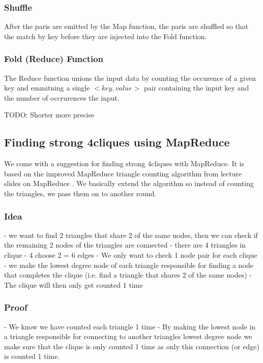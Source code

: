 \documentclass{article}
\begin{document}
\subsubsection{Shuffle}
After the paris are emitted by the Map function, the paris are shuffled so that the match by key before they are injected into the Fold function.

\subsubsection{Fold (Reduce) Function}
The Reduce function unions the input data by counting the occurence of a given key and emmitning a single $<key,value>$ pair containing the input key and the number of occrurences the input.

TODO: Shorter more precise

\subsection{Finding strong 4cliques using MapReduce}
We come with a suggestion for finding strong 4cliques with MapReduce. It is based on the improved MapReduce triangle counting algorithm from lecture slides on MapReduce \cite{lnMapReduce}. We basically extend the algorithm so instead of counting the triangles, we pass them on to another round.

\subsubsection{Idea}
- we want to find 2 triangles that share 2 of the same nodes, then we can check if the remaining 2 nodes of the triangles are connected
- there are 4 triangles in clique - 4 choose 2 = 6 edges
- We only want to check 1 node pair for each clique
- we make the lowest degree node of each triangle responsible for finding a node that completes the clique (i.e. find a triangle that shares 2 of the same nodes)
- The clique will then only get counted 1 time

\subsubsection{Proof}
- We know we have counted each triangle 1 time
- By making the lowest node in a triangle responsible for connecting to another triangles lowest degree node we make sure that the clique is only counted 1 time as only this connection (or edge) is counted 1 time.
\end{document}
